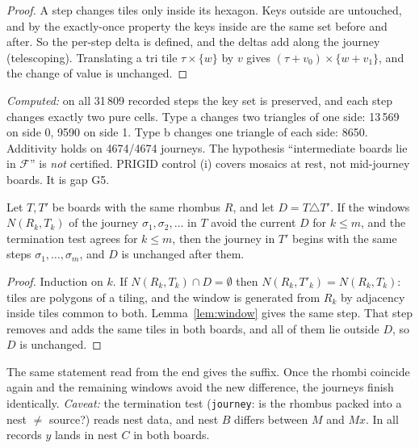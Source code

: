 \documentclass[11pt]{article}
\theoremstyle{definition}\newtheorem{definition}[theorem]{Definition}\newtheorem{remark}[theorem]{Remark}
\begin{document}
\begin{proof}
A step changes tiles only inside its hexagon. Keys outside are untouched, and by the exactly-once property the keys inside are the same set before and after. So the per-step delta is defined,
and the deltas add along the journey (telescoping). Translating a tri tile $\tau\times\{w\}$ by $v$ gives $(\tau+v_0)\times\{w+v_1\}$, and the change of value is unchanged.
\end{proof}
\noindent\emph{Computed:} on all 31\,809 recorded steps the key set is preserved, and each step changes exactly two pure cells. Type a changes two triangles of one side: 13\,569 on side 0, 9590 on side 1.
Type b changes one triangle of each side: 8650. Additivity holds on 4674/4674 journeys. The hypothesis ``intermediate boards lie in $\mathcal F$'' is \emph{not} certified. PRIGID control (i)
covers mosaics at rest, not mid-journey boards. It is gap G5.

\begin{proposition}\label{prop:prefix}
Let $T,T'$ be boards with the same rhombus $R$, and let $D=T\triangle T'$. If the windows $N(R_k,T_k)$ of the journey $\sigma_1,\sigma_2,\dots$ in $T$ avoid the current $D$ for
$k\le m$, and the termination test agrees for $k\le m$, then the journey in $T'$ begins with the same steps $\sigma_1,\dots,\sigma_m$, and $D$ is unchanged after them.
\end{proposition}
\begin{proof}
Induction on $k$. If $N(R_k,T_k)\cap D=\emptyset$ then $N(R_k,T'_k)=N(R_k,T_k)$: tiles are polygons of a tiling, and the window is generated from $R_k$ by adjacency inside tiles common to both.
Lemma~\ref{lem:window} gives the same step. That step removes and adds the same tiles in both boards, and all of them lie outside $D$, so $D$ is unchanged.
\end{proof}
The same statement read from the end gives the suffix. Once the rhombi coincide again and the remaining windows avoid the new difference, the journeys finish identically.
\emph{Caveat:} the termination test (\texttt{journey}: is the rhombus packed into a nest $\ne$ source?) reads nest data, and nest $B$ differs between $M$ and $Mx$. In all records
$y$ lands in nest $C$ in both boards.
\end{document}
